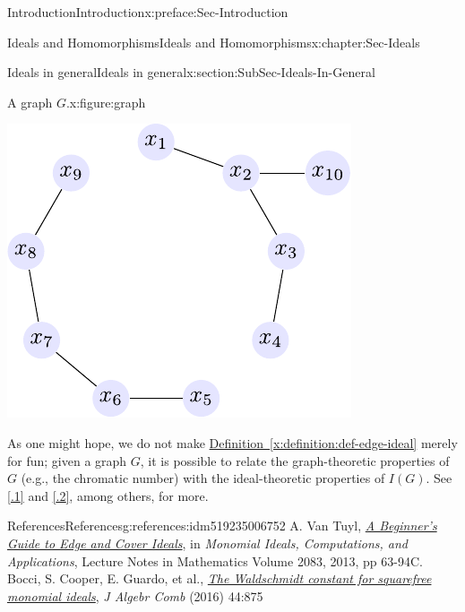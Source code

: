 \documentclass[oneside,10pt,]{book}
\newcommand{\xreffont}{\relax}
\numberwithin{equation}{section}
\begin{document}
\begin{preface}{Introduction}{}{Introduction}{}{}{x:preface:Sec-Introduction}
\begin{chapterptx}{Ideals and Homomorphisms}{}{Ideals and Homomorphisms}{}{}{x:chapter:Sec-Ideals}
\begin{sectionptx}{Ideals in general}{}{Ideals in general}{}{}{x:section:SubSec-Ideals-In-General}
\begin{figureptx}{A graph \(G\).}{x:figure:graph}{}
\begin{image}{0.25}{0.5}{0.25}
\includegraphics[width=\linewidth]{./images/graph.pdf}
\end{image}%
\tcblower
\end{figureptx}%
As one might hope, we do not make \hyperref[x:definition:def-edge-ideal]{Definition~{\xreffont\ref{x:definition:def-edge-ideal}}} merely for fun; given a graph \(G\), it is possible to relate the graph-theoretic properties of \(G\) (e.g., the chromatic number) with the ideal-theoretic properties of \(I(G)\). See \hyperlink{x:biblio:vantuyl-intro}{[{\xreffont 4.1.1}]} and \hyperlink{x:biblio:mfo-waldschmidt}{[{\xreffont 4.1.2}]}, among others, for more.%
%
%
\typeout{************************************************}
\typeout{************************************************}
%
\begin{references-subsection-numberless}{References}{}{References}{}{}{g:references:idm519235006752}
A. Van Tuyl, \emph{\href{http://dx.doi.org/doi:10.1007/978-3-642-38742-5_3}{A Beginner's Guide to Edge and Cover Ideals}}, in \emph{Monomial Ideals, Computations, and Applications}, Lecture Notes in Mathematics Volume 2083, 2013, pp 63-94C. Bocci, S. Cooper, E. Guardo, et al., \emph{\href{https://doi.org/10.1007/s10801-016-0693-7}{The Waldschmidt constant for squarefree monomial ideals}}, \emph{J Algebr Comb} (2016) 44:875\end{references-subsection-numberless}
\end{sectionptx}
%
%
\typeout{************************************************}

\end{chapterptx}
\end{preface}
\end{document}
